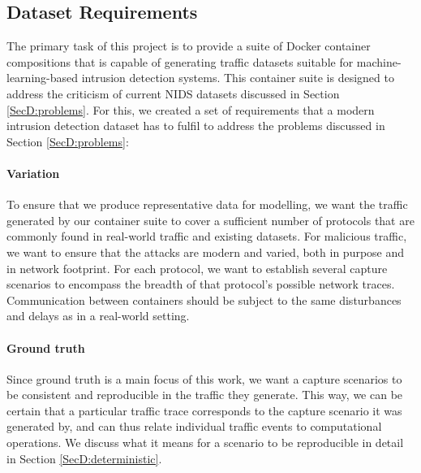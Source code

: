 \subsection{Dataset Requirements}\label{SecD:require}


The primary task of this project is to provide a suite of Docker container compositions that is capable of generating traffic datasets suitable for machine-learning-based intrusion detection systems. This container suite is designed to address the criticism of current NIDS datasets discussed in Section \ref{SecD:problems}. For this, we created a set of requirements that a modern intrusion detection dataset has to fulfil to address the problems discussed in Section \ref{SecD:problems}:





 \paragraph{Variation} To ensure that we produce representative data for modelling, we want the traffic generated by our container suite to cover a sufficient number of protocols that are commonly found in real-world traffic and existing datasets. For malicious traffic, we want to ensure that the attacks are modern and varied, both in purpose and in network footprint. For each protocol, we want to establish several capture scenarios to encompass the breadth of that protocol's possible network traces. Communication between containers should be subject to the same disturbances and delays as in a real-world setting.

 
 
\paragraph{Ground truth} Since ground truth is a main focus of this work, we want a capture scenarios to be consistent and reproducible in the traffic they generate. This way, we can be certain that a particular traffic trace corresponds to the capture scenario it was generated by, and can thus relate individual traffic events to computational operations. We discuss what it means for a scenario to be reproducible in detail in Section \ref{SecD:deterministic}. 

